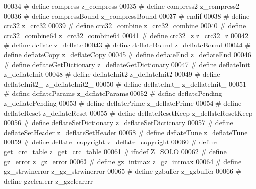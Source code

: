 \begin{DoxyCode}
00034 \textcolor{preprocessor}{#    define compress              z\_compress}
00035 \textcolor{preprocessor}{#    define compress2             z\_compress2}
00036 \textcolor{preprocessor}{#    define compressBound         z\_compressBound}
00037 \textcolor{preprocessor}{#  endif}
00038 \textcolor{preprocessor}{#  define crc32                 z\_crc32}
00039 \textcolor{preprocessor}{#  define crc32\_combine         z\_crc32\_combine}
00040 \textcolor{preprocessor}{#  define crc32\_combine64       z\_crc32\_combine64}
00041 \textcolor{preprocessor}{#  define crc32\_z               z\_crc32\_z}
00042 \textcolor{preprocessor}{#  define deflate               z\_deflate}
00043 \textcolor{preprocessor}{#  define deflateBound          z\_deflateBound}
00044 \textcolor{preprocessor}{#  define deflateCopy           z\_deflateCopy}
00045 \textcolor{preprocessor}{#  define deflateEnd            z\_deflateEnd}
00046 \textcolor{preprocessor}{#  define deflateGetDictionary  z\_deflateGetDictionary}
00047 \textcolor{preprocessor}{#  define deflateInit           z\_deflateInit}
00048 \textcolor{preprocessor}{#  define deflateInit2          z\_deflateInit2}
00049 \textcolor{preprocessor}{#  define deflateInit2\_         z\_deflateInit2\_}
00050 \textcolor{preprocessor}{#  define deflateInit\_          z\_deflateInit\_}
00051 \textcolor{preprocessor}{#  define deflateParams         z\_deflateParams}
00052 \textcolor{preprocessor}{#  define deflatePending        z\_deflatePending}
00053 \textcolor{preprocessor}{#  define deflatePrime          z\_deflatePrime}
00054 \textcolor{preprocessor}{#  define deflateReset          z\_deflateReset}
00055 \textcolor{preprocessor}{#  define deflateResetKeep      z\_deflateResetKeep}
00056 \textcolor{preprocessor}{#  define deflateSetDictionary  z\_deflateSetDictionary}
00057 \textcolor{preprocessor}{#  define deflateSetHeader      z\_deflateSetHeader}
00058 \textcolor{preprocessor}{#  define deflateTune           z\_deflateTune}
00059 \textcolor{preprocessor}{#  define deflate\_copyright     z\_deflate\_copyright}
00060 \textcolor{preprocessor}{#  define get\_crc\_table         z\_get\_crc\_table}
00061 \textcolor{preprocessor}{#  ifndef Z\_SOLO}
00062 \textcolor{preprocessor}{#    define gz\_error              z\_gz\_error}
00063 \textcolor{preprocessor}{#    define gz\_intmax             z\_gz\_intmax}
00064 \textcolor{preprocessor}{#    define gz\_strwinerror        z\_gz\_strwinerror}
00065 \textcolor{preprocessor}{#    define gzbuffer              z\_gzbuffer}
00066 \textcolor{preprocessor}{#    define gzclearerr            z\_gzclearerr}

\end{DoxyCode}

